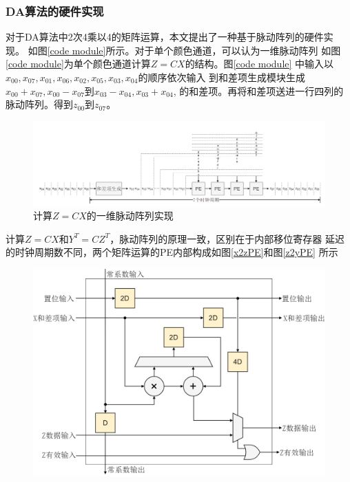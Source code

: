 \documentclass{article}
\numberwithin {equation}{section}
\begin{document}
\begin{spacing}{1.25}
      \subsubsection{DA算法的硬件实现}
        \vspace{1em}
        对于DA算法中2次4乘以4的矩阵运算，本文提出了一种基于脉动阵列的硬件实
        现。 如图\ref{code module}所示。对于单个颜色通道，可以认为一维脉动阵列
        如图\ref{code module}为单个颜色通道计算$Z=CX$的结构。图\ref{code module}
        中输入以$x_{00},x_{07},x_{01},x_{06},x_{02},x_{05},x_{03},x_{04}$的顺序依次输入
        到和差项生成模块生成$x_{00}+x_{07},x_{00}-x_{07}$到$x_{03}-x_{04},x_{03}+x_{04}$,
        的和差项。再将和差项送进一行四列的脉动阵列。得到$z_{00}$到$z_{07}$。
        \begin{figure}[H]
          \centering
          \includegraphics[scale=0.425]{./pictures/DCT脉动阵列.png}
          \caption{计算$Z=CX$的一维脉动阵列实现}
          \label{DCT脉动阵列}
        \end{figure}
        计算$Z=CX$和$Y^{T}=CZ^{T}$，脉动阵列的原理一致，区别在于内部移位寄存器
        延迟的时钟周期数不同，两个矩阵运算的PE内部构成如图\ref{x2zPE}和图\ref{z2yPE}
        所示
        \begin{figure}[H]
          \centering
          \includegraphics[scale=0.25]{./pictures/x2zPE.png}

\end{figure}
\end{spacing}
\end{document}
